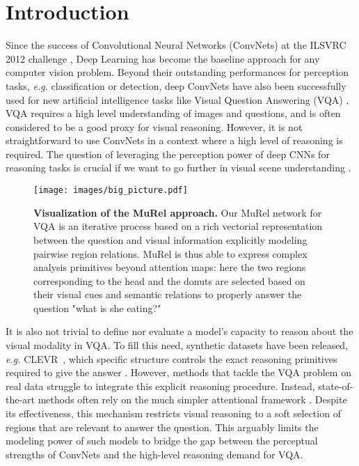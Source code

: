 \documentclass[10pt,twocolumn,letterpaper]{article}
\begin{document}
\section{Introduction}

Since the success of Convolutional Neural Networks (ConvNets) at the ILSVRC 2012 challenge \cite{NIPS2012_4824}, Deep Learning has become the baseline approach for any computer vision problem. 
Beyond their outstanding performances for perception tasks, \textit{e.g.} classification or detection, deep ConvNets have also been successfully used for new artificial intelligence tasks like Visual Question Answering (VQA) \cite{VQA,VQA2_Goyal_2017_CVPR,Kafle_2017_ICCV}. VQA requires a high level understanding of images and questions, and is often considered to be a good proxy for visual reasoning.
However, it is not straightforward to use ConvNets in a context where a high level of reasoning is required. The question of leveraging the perception power of deep CNNs for reasoning tasks is crucial if we want to go further in visual scene understanding \cite{johnson2016clevr, chen18iterative}.

\begin{figure}
    \centering
    \texttt{[image: images/big\_picture.pdf]}
    \caption{\label{fig:big_picture} \textbf{Visualization of the MuRel approach.}
    Our MuRel network for VQA is an iterative process based on a rich vectorial representation between the question and visual information explicitly modeling pairwise region relations. MuRel is thus able to express complex analysis primitives beyond attention maps: here the two regions corresponding to the head and the donuts are selected based on their visual cues and semantic relations to properly answer the question "what is she eating?" \vspace{-0.4cm}}
\end{figure}

It is also not trivial to define nor evaluate a model's capacity to reason about the visual modality in VQA. To fill this need, synthetic datasets have been released, \textit{e.g.} CLEVR~\cite{johnson2016clevr},  which specific structure controls the exact reasoning primitives required to give the answer \cite{johnson2017inferring, hu2017learning, Mascharka_2018_CVPR}.
However, methods that tackle the VQA problem on real data struggle to integrate this explicit reasoning procedure. Instead, state-of-the-art methods often rely on the much simpler attentional framework \cite{FukuiPYRDR16, benyounescadene2017mutan, Kim2017, chen2017sva}. Despite its effectiveness, this mechanism restricts visual reasoning to a soft selection of regions that are relevant to answer the question.
This arguably limits the modeling power of such models to bridge the gap between the perceptual strengths of ConvNets and the high-level reasoning demand for VQA.
\end{document}
